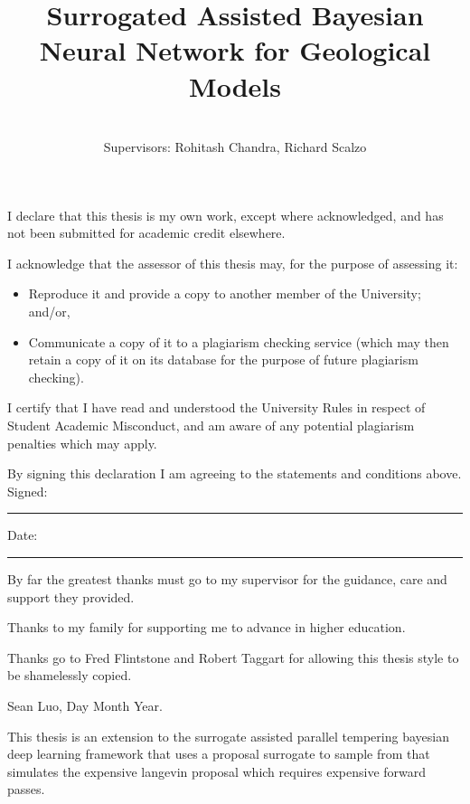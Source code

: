 \documentclass[honours,12pt]{unswthesis}
\title{Surrogated Assisted Bayesian Neural Network for Geological Models}
\author{\Authornameonly\\{\bigskip}Supervisors: Rohitash Chandra, Richard Scalzo}
\newcommand\blankpage{%
    \null
    \thispagestyle{empty}%
    \addtocounter{page}{-1}%
    \newpage}
\numberwithin{equation}{section}
\begin{document}
\beforepreface

\afterpage{\blankpage}



\vskip 10pc \noindent I declare that this thesis is my
own work, except where acknowledged, and has not been submitted for
academic credit elsewhere. 

\vskip 2pc  \noindent I acknowledge that the assessor of this
thesis may, for the purpose of assessing it:
\begin{itemize}
\item Reproduce it and provide a copy to another member of the University; and/or,
\item Communicate a copy of it to a plagiarism checking service (which may then retain a copy of it on its database for the purpose of future plagiarism checking).
\end{itemize}

\vskip 2pc \noindent I certify that I have read and understood the University Rules in
respect of Student Academic Misconduct, and am aware of any potential plagiarism penalties which may 
apply.\vspace{24pt}

\vskip 2pc \noindent By signing 
this declaration I am
agreeing to the statements and conditions above.
\vskip 2pc \noindent
Signed: \rule{7cm}{0.25pt} \hfill Date: \rule{4cm}{0.25pt} \newline
\vskip 1pc

\afterpage{\blankpage}




{\bigskip}By far the greatest thanks must go to my supervisor for
the guidance, care and support they provided. 
 
{\bigskip} Thanks to my family for supporting me to advance in higher education.

{\bigskip\noindent} Thanks go to Fred Flintstone and Robert Taggart for allowing this thesis
style to be shamelessly copied.

{\bigskip\bigskip\bigskip\noindent} Sean Luo, Day Month Year.

\afterpage{\blankpage}



This thesis is an extension to the surrogate assisted parallel tempering bayesian deep learning framework that uses a proposal surrogate to sample from that simulates the expensive langevin proposal which requires expensive forward passes. 
\end{document}

